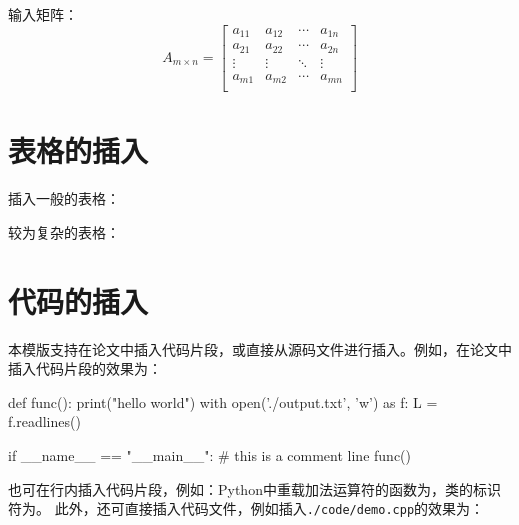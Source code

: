 输入矩阵：
\begin{equation}
	\label{eqn:matrix}
	A_{m\times n}=
	\left[ {\begin{array}{cccc}
			a_{11} & a_{12} & \cdots & a_{1n}\\
			a_{21} & a_{22} & \cdots & a_{2n}\\
			\vdots & \vdots & \ddots & \vdots\\
			a_{m1} & a_{m2} & \cdots & a_{mn}\\
	\end{array}}\right]
\end{equation}

\section{表格的插入}
\label{sec:table}
插入一般的表格：


较为复杂的表格：


\section{代码的插入}
\label{sec:code}
本模版支持在论文中插入代码片段，或直接从源码文件进行插入。例如，在论文中插入代码片段的效果为：
\begin{python}
def func():
print("hello world")
with open('./output.txt', 'w') as f:
L = f.readlines()
	
if __name__ == "__main__":
# this is a comment line
func()
\end{python}
也可在行内插入代码片段，例如：Python中重载加法运算符的函数为，类的标识符为。
此外，还可直接插入代码文件，例如插入\texttt{./code/demo.cpp}的效果为：


